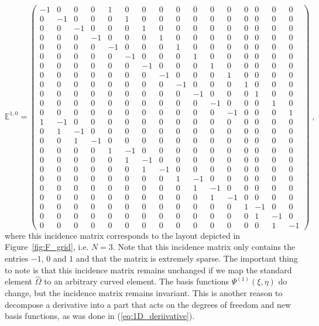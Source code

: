 \documentclass[graybox]{svmult}
\begin{document}
\[
\mathbb{E}^{1,0} = \left ( \begin{array}{cccccccccccccccc}
-1 & 0 & 0 & 0 & 1 & 0 & 0 & 0 & 0 & 0 & 0 & 0 & 0 & 0 & 0 & 0 \\
0 & -1 & 0 & 0 & 0 & 1 & 0 & 0 & 0 & 0 & 0 & 0 & 0 & 0 & 0 & 0 \\
0 & 0 & -1 & 0 & 0 & 0 & 1 & 0 & 0 & 0 & 0 & 0 & 0 & 0 & 0 & 0 \\
0 & 0 & 0 & -1 & 0 & 0 & 0 & 1 & 0 & 0 & 0 & 0 & 0 & 0 & 0 & 0 \\
0 & 0 & 0 & 0 & -1 & 0 & 0 & 0 & 1 & 0 & 0 & 0 & 0 & 0 & 0 & 0 \\
0 & 0 & 0 & 0 & 0 & -1 & 0 & 0 & 0 & 1 & 0 & 0 & 0 & 0 & 0 & 0 \\
0 & 0 & 0 & 0 & 0 & 0 & -1 & 0 & 0 & 0 & 1 & 0 & 0 & 0 & 0 & 0 \\
0 & 0 & 0 & 0 & 0 & 0 & 0 & -1 & 0 & 0 & 0 & 1 & 0 & 0 & 0 & 0 \\
0 & 0 & 0 & 0 & 0 & 0 & 0 & 0 & -1 & 0 & 0 & 0 & 1 & 0 & 0 & 0 \\
0 & 0 & 0 & 0 & 0 & 0 & 0 & 0 & 0 & -1 & 0 & 0 & 0 & 1 & 0 & 0 \\
0 & 0 & 0 & 0 & 0 & 0 & 0 & 0 & 0 & 0 & -1 & 0 & 0 & 0 & 1 & 0 \\
0 & 0 & 0 & 0 & 0 & 0 & 0 & 0 & 0 & 0 & 0 & -1 & 0 & 0 & 0 & 1 \\
1 & -1 & 0 & 0 & 0 & 0 & 0 & 0 & 0 & 0 & 0 & 0 & 0 & 0 & 0 & 0 \\
0 & 1 & -1 & 0 & 0 & 0 & 0 & 0 & 0 & 0 & 0 & 0 & 0 & 0 & 0 & 0 \\
0 & 0 & 1 & -1 & 0 & 0 & 0 & 0 & 0 & 0 & 0 & 0 & 0 & 0 & 0 & 0 \\
0 & 0 & 0 & 0 & 1 & -1 & 0 & 0 & 0 & 0 & 0 & 0 & 0 & 0 & 0 & 0 \\
0 & 0 & 0 & 0 & 0 & 1 & -1 & 0 & 0 & 0 & 0 & 0 & 0 & 0 & 0 & 0 \\
0 & 0 & 0 & 0 & 0 & 0 & 1 & -1 & 0 & 0 & 0 & 0 & 0 & 0 & 0 & 0 \\
0 & 0 & 0 & 0 & 0 & 0 & 0 & 0 & 1 & -1 & 0 & 0 & 0 & 0 & 0 & 0 \\
0 & 0 & 0 & 0 & 0 & 0 & 0 & 0 & 0 & 1 & -1 & 0 & 0 & 0 & 0 & 0 \\
0 & 0 & 0 & 0 & 0 & 0 & 0 & 0 & 0 & 0 & 1 & -1 & 0 & 0 & 0 & 0 \\
0 & 0 & 0 & 0 & 0 & 0 & 0 & 0 & 0 & 0 & 0 & 0 & 1 & -1 & 0 & 0 \\
0 & 0 & 0 & 0 & 0 & 0 & 0 & 0 & 0 & 0 & 0 & 0 & 0 & 1 & -1 & 0 \\
0 & 0 & 0 & 0 & 0 & 0 & 0 & 0 & 0 & 0 & 0 & 0 & 0 & 0 & 1 & -1
\end{array} \right ) \;,
\]
where this incidence matrix corresponds to the layout depicted in Figure~\ref{fig:F_grid}, i.e. $N=3$. Note that this incidence matrix only contains the entries $-1$, $0$ and $1$ and that the matrix is extremely sparse. The important thing to note is that this incidence matrix remains unchanged if we map the standard element $\hat{\Omega}$ to an arbitrary curved element. The basis functions $\Psi^{(1)}(\xi,\eta)$ do change, but the incidence matrix remains invariant. This is another reason to decompose a derivative into a part that acts on the degrees of freedom and new basis functions, as was done in (\ref{eq:1D_deriivative}).
\end{document}
